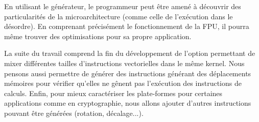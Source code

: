     En utilisant le générateur, le programmeur peut être amené à découvrir des particularités de la microarchitecture (comme celle de l'exécution dans le désordre). En comprenant précisément le fonctionnement de la FPU, il pourra même trouver des optimisations pour sa propre application.
    
    La suite du travail comprend la fin du développement de l'option permettant de mixer différentes tailles d'instructions vectorielles dans le même kernel. Nous pensons aussi permettre de générer des instructions générant des déplacements mémoires pour vérifier qu'elles ne gênent pas l'exécution des instructions de calculs. Enfin, pour mieux caractériser les plate-formes pour certaines applications comme en cryptographie, nous allons ajouter d'autres instructions pouvant être générées (rotation, décalage...).